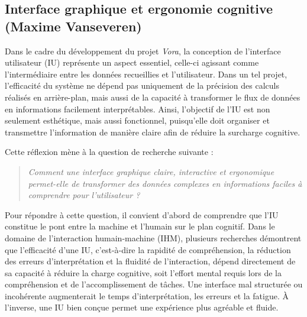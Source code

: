 \documentclass{rapportbrebeuf}
\begin{document}
\newpage
\subsection{Interface graphique et ergonomie cognitive (Maxime Vanseveren)}

Dans le cadre du développement du projet \textit{Vora}, la conception de l’interface utilisateur (IU) représente un aspect essentiel, celle-ci agissant comme l’intermédiaire entre les données recueillies et l’utilisateur. Dans un tel projet, l’efficacité du système ne dépend pas uniquement de la précision des calculs réalisés en arrière-plan, mais aussi de la capacité à transformer le flux de données en informations facilement interprétables. Ainsi, l’objectif de l’IU est non seulement esthétique, mais aussi fonctionnel, puisqu’elle doit organiser et transmettre l’information de manière claire afin de réduire la surcharge cognitive.

Cette réflexion mène à la question de recherche suivante : 

\begin{quote}
  \raggedright
  \textit{\textit{Comment une interface graphique claire, interactive et ergonomique permet-elle de transformer des données complexes en informations faciles à comprendre pour l’utilisateur ?}
}
\end{quote}

Pour répondre à cette question, il convient d'abord de comprendre que l’IU constitue le pont entre la machine et l’humain sur le plan cognitif. Dans le domaine de l’interaction humain-machine (IHM), plusieurs recherches démontrent que l’efficacité d’une IU, c’est-à-dire la rapidité de compréhension, la réduction des erreurs d’interprétation et la fluidité de l’interaction, dépend directement de sa capacité à réduire la charge cognitive, soit l’effort mental requis lors de la compréhension et de l’accomplissement de tâches. Une interface mal structurée ou incohérente augmenterait le temps d’interprétation, les erreurs et la fatigue. À l’inverse, une IU bien conçue permet une expérience plus agréable et fluide.
\end{document}
